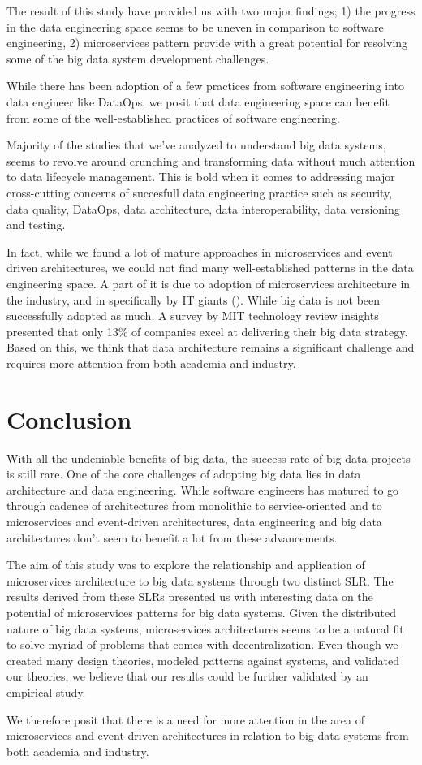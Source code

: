 \documentclass[conference]{IEEEtran}
\begin{document}
The result of this study have provided us with two major findings; 1) the progress in the data engineering space seems to be uneven in comparison to software engineering, 2) microservices pattern provide with a great potential for resolving some of the big data system development challenges. 

While there has been adoption of a few practices from software engineering into data engineer like DataOps, we posit that data engineering space can benefit from some of the well-established practices of software engineering. 

Majority of the studies that we've analyzed to understand big data systems, seems to revolve around crunching and transforming data without much attention to data lifecycle management. This is bold when it comes to addressing major cross-cutting concerns of succesfull data engineering practice such as security, data quality, DataOps, data architecture, data interoperability, data versioning and testing. 

In fact, while we found a lot of mature approaches in microservices and event driven architectures, we could not find many well-established patterns in the data engineering space. A part of it is due to adoption of microservices architecture in the industry, and in specifically by IT giants (\cite{Statisica}). While big data is not been successfully adopted as much. A survey by MIT technology review insights presented that only 13\% of companies excel at delivering their big data strategy. Based on this, we think that data architecture remains a significant challenge and requires more attention from both academia and industry. 


\section{Conclusion}

With all the undeniable benefits of big data, the success rate of big data projects is still rare. One of the core challenges of adopting big data lies in data architecture and data engineering. While software engineers has matured to go through cadence of architectures from monolithic to service-oriented and to microservices and event-driven architectures, data engineering and big data architectures don't seem to benefit a lot from these advancements. 

The aim of this study was to explore the relationship and application of microservices architecture to big data systems through two distinct SLR. The results derived from these SLRs presented us with interesting data on the potential of microservices patterns for big data systems. Given the distributed nature of big data systems, microservices architectures seems to be a natural fit to solve myriad of problems that comes with decentralization. Even though we created many design theories, modeled patterns against systems, and validated our theories, we believe that our results could be further validated by an empirical study. 

We therefore posit that there is a need for more attention in the area of microservices and event-driven architectures in relation to big data systems from both academia and industry. 





\end{document}
